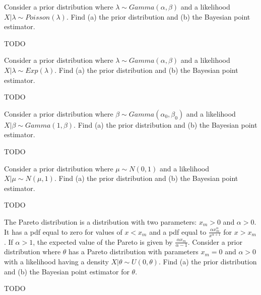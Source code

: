 
Consider a prior distribution where $\lambda \sim Gamma(\alpha, \beta)$ and a 
likelihood $X|\lambda \sim Poisson(\lambda)$. Find (a) the prior distribution
and (b) the Bayesian point estimator.


TODO


Consider a prior distribution where $\lambda \sim Gamma(\alpha, \beta)$ and a 
likelihood $X|\lambda \sim Exp(\lambda)$. Find (a) the prior distribution
and (b) the Bayesian point estimator.


TODO


Consider a prior distribution where $\beta \sim Gamma(\alpha_0, \beta_0)$ and a 
likelihood $X|\beta \sim Gamma(1, \beta)$. Find (a) the prior distribution
and (b) the Bayesian point estimator.


TODO



Consider a prior distribution where $\mu \sim N(0, 1)$ and a 
likelihood $X|\mu \sim N(\mu, 1)$. Find (a) the prior distribution
and (b) the Bayesian point estimator.


TODO



The Pareto distribution is a distribution with two parameters:
$x_m>0$ and $\alpha > 0$. It has a pdf equal to zero for values of $x < x_m$
and a pdf equal to $\frac{\alpha x_m^\alpha}{x^{\alpha + 1}}$ for $x > x_m$.
If $\alpha > 1$, the expected value of the Pareto is given by
$\frac{\alpha x_m}{\alpha - 1}$. Consider a prior distribution where $\theta$
has a Pareto distribution with parameters $x_m=0$ and $\alpha > 0$ with a
likelihood having a density $X|\theta \sim U(0, \theta)$.
Find (a) the prior distribution and (b) the Bayesian point estimator for $\theta$.


TODO
